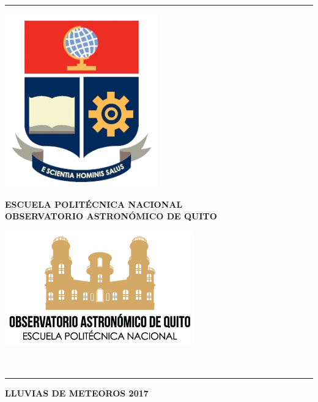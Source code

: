 \documentclass[12pt,a4paper,oneside]{article}
\begin{document}
\rule[1mm]{170mm}{0.20mm}
\begin{minipage}[d]{30mm}
\begin{center}
\includegraphics[scale=0.30]{logo_epn.png}
\end{center}
\end{minipage}
\begin{minipage}[d]{100mm}
\begin{center}
\vspace{0.5cm}
\textsf{\textbf{\large ESCUELA POLITÉCNICA NACIONAL}}\\
\textsf{\textbf{\small OBSERVATORIO ASTRONÓMICO DE QUITO}}\\
\end{center}
\end{minipage}
\begin{minipage}[d]{30mm}
\begin{center}
\includegraphics[scale=.40]{logo.png}
\end{center}
\end{minipage}\\
\rule[1mm]{170mm}{0.20mm}
\begin{center}
\textbf{\huge LLUVIAS DE METEOROS 2017 \\}
\vspace{1cm}
\end{center}
\end{document}
